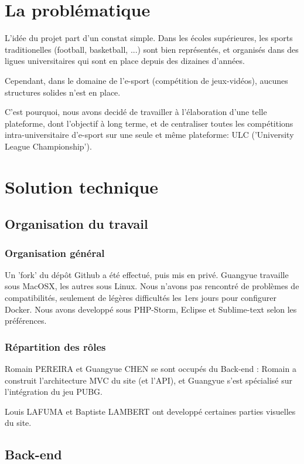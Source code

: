 \documentclass[10pt]{article}
\begin{document}
  \newpage
  \section{La problématique}
    L'idée du projet part d'un constat simple.
    Dans les écoles supérieures, les sports traditionelles (football, basketball, ...)
    sont bien représentés, et organisés dans des ligues universitaires qui sont en place depuis des dizaines d'années.
    
    Cependant, dans le domaine de l'e-sport (compétition de jeux-vidéos), aucunes structures solides n'est en place.
    
    C'est pourquoi, nous avons decidé de travailler à l'élaboration d'une telle plateforme, dont l'objectif à long terme,
    et de centraliser toutes les compétitions intra-universitaire d'e-sport sur une seule et même plateforme: ULC ('University League Championship').

  \section{Solution technique}
    \subsection{Organisation du travail}
      \subsubsection{Organisation général}
	Un 'fork' du dépôt Github a été effectué, puis mis en privé. Guangyue travaille sous MacOSX, les autres sous Linux.
	Nous n'avons pas rencontré de problèmes de compatibilités, seulement de légères difficultés les 1ers jours pour configurer Docker.
	Nous avons developpé sous PHP-Storm, Eclipse et Sublime-text selon les préférences.
      \subsubsection{Répartition des rôles}
	Romain PEREIRA et Guangyue CHEN se sont occupés du Back-end : Romain a construit l'architecture MVC du site (et l'API),
	et Guangyue s'est spécialisé sur l'intégration du jeu PUBG.
	
	Louis LAFUMA et Baptiste LAMBERT ont developpé certaines parties visuelles du site.
    \subsection{Back-end}
\end{document}
